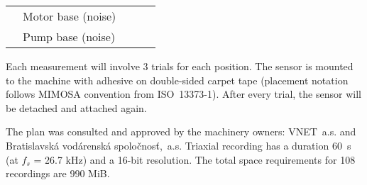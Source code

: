 \begin{table}[ht]
\begin{tabular}{|l|l|p{0.6cm}|p{0.6cm}|p{0.6cm}|p{0.6cm}|p{0.6cm}|p{0.6cm}|}
                                                                                      & Motor base (noise)                      & \multicolumn{2}{p{1.2cm}|}{}                 & \multicolumn{2}{p{1.2cm}|}{}                 & \multicolumn{2}{p{1.2cm}|}{}                 \\ \cline{2-8} 
                                                                                      & Pump base (noise)                       & \multicolumn{2}{p{1.2cm}|}{}                 & \multicolumn{2}{p{1.2cm}|}{}                 & \multicolumn{2}{p{1.2cm}|}{}                 \\ \hline
\end{tabular}
\end{table}
Each measurement will involve 3 trials for each position. The sensor is mounted to the machine with adhesive on double-sided carpet tape (placement notation follows MIMOSA convention from ISO~13373-1). After every trial, the sensor will be detached and attached again. 

The plan was consulted and approved by the machinery owners: VNET~a.s. and Bratislavská vodárenská spoločnosť,~a.s. Triaxial recording has a duration 60~s (at $f_s$ = 26.7 kHz) and a 16-bit resolution. The total space requirements for 108 recordings are 990 MiB.